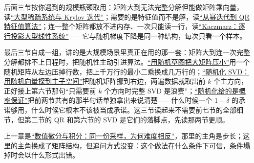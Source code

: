 后面三节按你遇到的规模瓶颈取用：矩阵大到无法完整分解但能做矩阵乘向量，读\hyperref[sec:08-Numerical-Analysis/05-Numerical-Linear-Algebra/04]{``大型稀疏系统与 Krylov 迭代''}；需要的是特征值而不是解，读\hyperref[sec:08-Numerical-Analysis/05-Numerical-Linear-Algebra/05]{``从幂迭代到 QR 特征值算法''}；连一整个矩阵都放不进内存、一次只能读一行，读\hyperref[sec:08-Numerical-Analysis/05-Numerical-Linear-Algebra/07]{``Kaczmarz：逐行投影大型线性系统''}——它与随机梯度下降是同一种结构，每次只看一个样本。

最后三节自成一组，讲的是大规模场景里真正在用的那一套：矩阵大到连一次完整分解都排不上日程时，把随机性主动引进算法。\hyperref[sec:08-Numerical-Analysis/05-Numerical-Linear-Algebra/08]{``用随机草图把大矩阵压小''}用一个随机矩阵从左边压掉行数，把上千万行的最小二乘换成几万行的；\hyperref[sec:08-Numerical-Analysis/05-Numerical-Linear-Algebra/09]{``随机化 SVD：用随机向量探到主子空间''}把随机矩阵挪到右边，两遍数据就取出前 \(k\) 个主方向，正好接上第六节那句``只需要前 \(k\) 个方向时完整 SVD 是浪费''；\hyperref[sec:08-Numerical-Analysis/05-Numerical-Linear-Algebra/10]{``随机化给的是概率保证''}把前两节共有的那半句话单独拿出来说清楚——什么时候一个 \(1-\delta\) 的承诺够用，什么时候它根本不该被当成承诺。这三节读起来不需要前七节的全部细节，但第二节的 QR 和第六节的 SVD 是它们的落脚点，先读那两节更顺。

上一章是\hyperref[ch:064]{``数值微分与积分：同一份采样，为何难度相反''}，那里的主角是步长；这里的主角换成了矩阵结构，但追问方式没变：这个做法在什么条件下可信，条件塌掉时会以什么形式出错。
